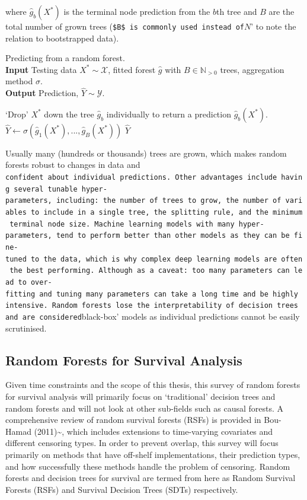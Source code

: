 \documentclass[
  letterpaper,
]{scrbook}
\theoremstyle{plain}
\theoremstyle{definition}
\theoremstyle{remark}
\begin{document}
where \(\hat{g}_b(X^*)\) is the terminal node prediction from the
\(b\)th tree and \(B\) are the total number of grown trees
(\texttt{\$B\$\textquotesingle{}\ is\ commonly\ used\ instead\ of}\(N\)'
to note the relation to bootstrapped data).

\begin{algorithm}
\caption{Predicting from a random forest. \\
\textbf{Input} Testing data $X^* \sim \mathcal{X}$, fitted forest $\hat{g}$ with $B \in \mathbb{N}_{> 0}$ trees, aggregation method $\sigma$. \\
\textbf{Output} Prediction, $\hat{Y}\sim \mathcal{Y}$.}\label{alg:rsf_pred}
\begin{algorithmic}[1]
\State `Drop' $X^*$ down the tree $\hat{g}_b$ individually to return a prediction $\hat{g}_b(X^*)$.
\EndFor
\State $\hat{Y}\gets \sigma(\hat{g}_1(X^*),...,\hat{g}_B(X^*))$
\State\Return$\hat{Y}$
\end{algorithmic}
\end{algorithm}

Usually many (hundreds or thousands) trees are grown, which makes random
forests robust to changes in data and
\texttt{confident\textquotesingle{}\ about\ individual\ predictions.\ Other\ advantages\ include\ having\ several\ tunable\ hyper-parameters,\ including:\ the\ number\ of\ trees\ to\ grow,\ the\ number\ of\ variables\ to\ include\ in\ a\ single\ tree,\ the\ splitting\ rule,\ and\ the\ minimum\ terminal\ node\ size.\ Machine\ learning\ models\ with\ many\ hyper-parameters,\ tend\ to\ perform\ better\ than\ other\ models\ as\ they\ can\ be\ fine-tuned\ to\ the\ data,\ which\ is\ why\ complex\ deep\ learning\ models\ are\ often\ the\ best\ performing.\ Although\ as\ a\ caveat:\ too\ many\ parameters\ can\ lead\ to\ over-fitting\ and\ tuning\ many\ parameters\ can\ take\ a\ long\ time\ and\ be\ highly\ intensive.\ Random\ forests\ lose\ the\ interpretability\ of\ decision\ trees\ and\ are\ considered}black-box'
models as individual predictions cannot be easily scrutinised.

\subsection{Random Forests for Survival Analysis}

Given time constraints and the scope of this thesis, this survey of
random forests for survival analysis will primarily focus on
`traditional' decision trees and random forests and will not look at
other sub-fields such as causal forests. A comprehensive review of
random survival forests (RSFs) is provided in Bou-Hamad
(2011)\textasciitilde{}\cite{Bou-Hamad2011}, which includes extensions
to time-varying covariates and different censoring types. In order to
prevent overlap, this survey will focus primarily on methods that have
off-shelf implementations, their prediction types, and how successfully
these methods handle the problem of censoring. Random forests and
decision trees for survival are termed from here as Random Survival
Forests (RSFs) and Survival Decision Trees (SDTs) respectively.
\end{document}
